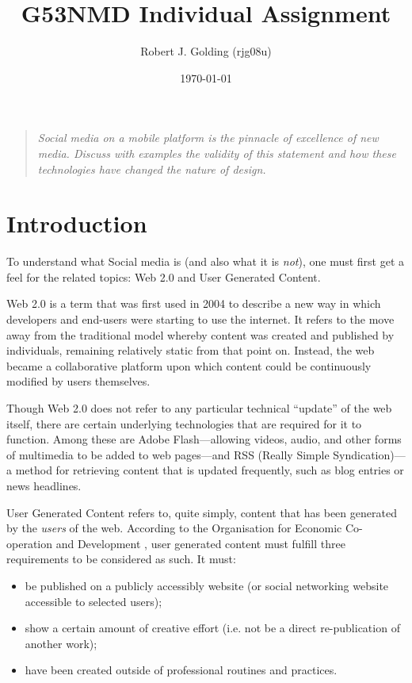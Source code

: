 \documentclass[a4paper,11pt]{article}
\title{G53NMD Individual Assignment}
\author{Robert J. Golding (rjg08u)} \date{\today}
\begin{document}
    \maketitle

    \begin{quote}
        \emph{Social media on a mobile platform is the pinnacle of excellence
        of new media. Discuss with examples the validity of this statement and
        how these technologies have changed the nature of design.}
    \end{quote}

    \section{Introduction}

    To understand what Social media is (and also what it is \emph{not}), one
    must first get a feel for the related topics: Web 2.0 and User Generated
    Content. \cite{kaplan2010}

    Web 2.0 is a term that was first used in 2004 to describe a new way in
    which developers and end-users were starting to use the internet. It refers
    to the move away from the traditional model whereby content was created and
    published by individuals, remaining relatively static from that point on.
    Instead, the web became a collaborative platform upon which content could
    be continuously modified by users themselves.

    Though Web 2.0 does not refer to any particular technical ``update'' of the
    web itself, there are certain underlying technologies that are required for
    it to function. Among these are Adobe Flash---allowing videos, audio, and
    other forms of multimedia to be added to web pages---and RSS (Really Simple
    Syndication)---a method for retrieving content that is updated frequently,
    such as blog entries or news headlines.

    User Generated Content refers to, quite simply, content that has been
    generated by the \emph{users} of the web. According to the Organisation for
    Economic Co-operation and Development \cite{vickery2007}, user generated
    content must fulfill three requirements to be considered as such. It must:

    \begin{itemize}
        \setlength{\parskip}{0pt}
        \item be published on a publicly accessibly website (or social
            networking website accessible to selected users);
        \item show a certain amount of creative effort (i.e. not be a direct
            re-publication of another work);
        \item have been created outside of professional routines and practices.
    \end{itemize}
\end{document}
